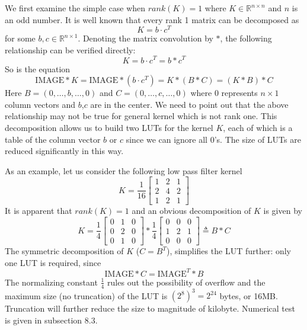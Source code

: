 \documentclass[12pt]{amsart}
\theoremstyle{definition}
\theoremstyle{remark}
\numberwithin{thm}{section}
\newcommand{\IMAGE}{\text{IMAGE}}
\begin{document}
We first examine the simple case when $rank(K)=1$ where $K\in \mathbb{R}^{n\times n}$ and $n$ is an odd number. It is well known that every rank 1 matrix can be decomposed as
\[K=b\cdot c^T\]
for some $b,c\in \mathbb{R}^{n\times 1}$. Denoting the matrix convolution by $*$, the following relationship can be verified directly: 
\[K=b\cdot c^T=b*c^T\]
So is the equation
\begin{equation}\label{decomposition}
\IMAGE*K=\IMAGE*(b\cdot c^T)=K*(B*C)=(K*B)*C
\end{equation}
Here $B=(0,\dots,b,\dots,0)$ and $C=(0,\dots,c,\dots,0)$ where $0$ represents $n\times 1$ column vectors and $b$,$c$ are in the center. We need to point out that the above relationship may not be true for general kernel which is not rank one. This decomposition allows us to build two LUTs for the kernel $K$, each of which is a table of the column vector $b$ or $c$ since we can ignore all $0$'s. The size of LUTs are reduced significantly in this way.

As an example, let us consider the following low pass filter kernel
$$
K=\frac{1}{16}
\begin{bmatrix}
1 & 2 & 1\\
2 & 4 & 2\\
1 & 2 & 1
\end{bmatrix}
$$
It is apparent that $rank(K)=1$ and an obvious decomposition of $K$ is given by 
$$
K=\frac{1}{4}
\begin{bmatrix}
0 & 1 & 0\\
0 & 2 & 0\\
0 & 1 & 0
\end{bmatrix}*\frac{1}{4}
\begin{bmatrix}
0 & 0 & 0\\
1 & 2 & 1\\
0 & 0 & 0
\end{bmatrix}\triangleq B*C
$$
The symmetric decomposition of $K$ ($C=B^T$), simplifies the LUT further: only one LUT is required, since
\[\IMAGE*C=\IMAGE^T*B\]
The normalizing constant $\frac{1}{4}$ rules out the possibility of overflow and the maximum size (no truncation) of the LUT is $(2^8)^3=2^{24}$ bytes, or 16MB. Truncation will further reduce the size to magnitude of kilobyte. Numerical test is given in subsection 8.3. 
\end{document}
